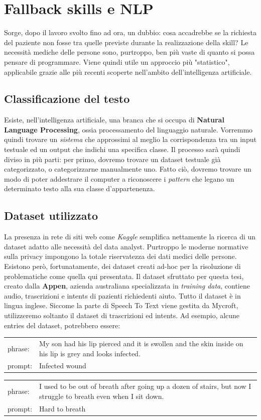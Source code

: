 \chapter{Fallback skills e NLP}
\label{chap:fallback}
Sorge, dopo il lavoro svolto fino ad ora, un dubbio: cosa accadrebbe se la richiesta del paziente non fosse tra quelle previste durante la realizzazione della skill?
Le necessità mediche delle persone sono, purtroppo, ben più vaste di quanto si possa pensare di programmare. Viene quindi utile un approccio più "statistico", applicabile grazie alle più recenti scoperte nell'ambito dell'intelligenza artificiale.
\section{Classificazione del testo}
Esiste, nell'intelligenza artificiale, una branca che si occupa di \textbf{Natural Language Processing}, ossia processamento del linguaggio naturale. Vorremmo quindi trovare un \textit{sistema} che approssimi al meglio la corrispondenza tra un input testuale ed un output che indichi una specifica classe. Il processo sarà quindi diviso in più parti: per primo, dovremo trovare un dataset testuale già categorizzato, o categorizzarne manualmente uno. Fatto ciò, dovremo trovare un modo di poter addestrare il computer a riconoscere i \textit{pattern} che legano un determinato testo alla sua classe d'appartenenza.
\section{Dataset utilizzato}
La presenza in rete di siti web come \textit{Kaggle} semplifica nettamente la ricerca di un dataset adatto alle necessità del data analyst. Purtroppo le moderne normative sulla privacy impongono la totale riservatezza dei dati medici delle persone. Esistono però, fortunatamente, dei dataset creati ad-hoc per la risoluzione di problematiche come quella qui presentata. Il dataset sfruttato per questa tesi, creato dalla \textbf{Appen}, azienda australiana specializzata in \textit{training data}, contiene audio, trascrizioni e intents di pazienti richiedenti aiuto. Tutto il dataset è in lingua inglese. Siccome la parte di Speech To Text viene gestita da Mycroft, utilizzeremo soltanto il dataset di trascrizioni ed intents. Ad esempio, alcune entries del dataset, potrebbero essere:
\begin{table}[H]
    \begin{tabularx}{\textwidth}{|l|X|}
        phrase: & My son had his lip pierced and it is swollen and the skin inside on his lip is grey and looks infected.
        \\
        prompt: & Infected wound
    \end{tabularx}
\end{table}
\begin{table}[H]
    \begin{tabularx}{\textwidth}{|l|X|}
        phrase: & I used to be out of breath after going up a dozen of stairs, but now I struggle to breath even when I sit down.
        \\
        prompt: & Hard to breath
    \end{tabularx}
\end{table}
